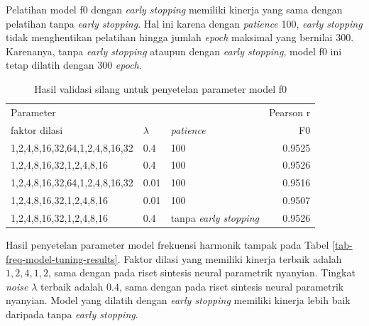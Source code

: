 Pelatihan model f0 dengan \textit{early stopping} memiliki kinerja yang sama dengan pelatihan tanpa \textit{early stopping}. Hal ini karena dengan \textit{patience} 100, \textit{early stopping} tidak menghentikan pelatihan hingga jumlah \textit{epoch} maksimal yang bernilai 300. Karenanya, tanpa \textit{early stopping} ataupun dengan \textit{early stopping}, model f0 ini tetap dilatih dengan 300 \textit{epoch}.

\begin{table}[htbp]
    \centering
    \caption{Hasil validasi silang untuk penyetelan parameter model f0}\label{tab-f0-model-tuning-results}
    \begin{tabular}{ |l|l|l|r| } 
     \hline
     \multicolumn{3}{|l|}{Parameter} & Pearson r\\
     \cline{1-3}
     faktor dilasi & $\lambda$ & \textit{patience} & F0\\
     \hline 
	1,2,4,8,16,32,64,1,2,4,8,16,32 & 0.4 &100      &0.9525\\\hline
	1,2,4,8,16,32,1,2,4,8,16 & 0.4 &100            &0.9526\\\hline
	1,2,4,8,16,32,64,1,2,4,8,16,32 & 0.01 &100     &0.9516\\\hline
	1,2,4,8,16,32,1,2,4,8,16 & 0.01 &100           &0.9507\\\hline
	1,2,4,8,16,32,1,2,4,8,16 & 0.4 &tanpa \textit{early stopping}    &0.9526\\\hline
    \end{tabular}
\end{table}

Hasil penyetelan parameter model frekuensi harmonik tampak pada Tabel \ref{tab-freq-model-tuning-results}. Faktor dilasi yang memiliki kinerja terbaik adalah $1,2,4,1,2$, sama dengan pada riset sintesis neural parametrik nyanyian. Tingkat \textit{noise} $\lambda$ terbaik adalah $0.4$, sama dengan pada riset sintesis neural parametrik nyanyian. Model yang dilatih dengan \textit{early stopping} memiliki kinerja lebih baik daripada tanpa \textit{early stopping}.

